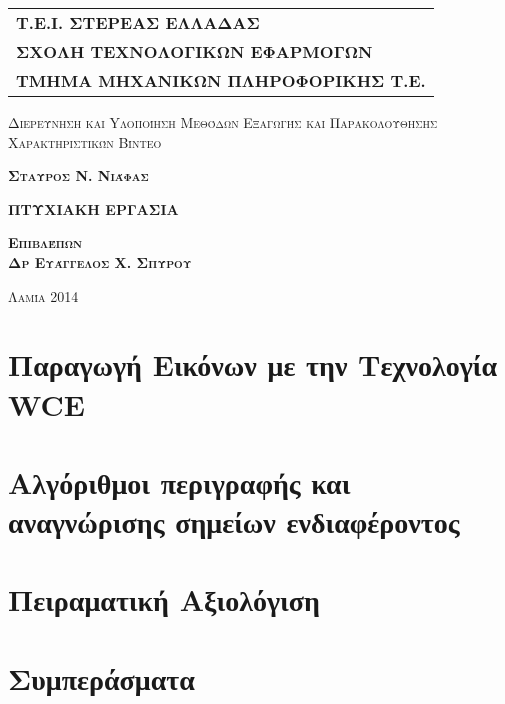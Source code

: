 \documentclass[a4paper,12pt]{report}
\begin{document}
\begin{tabular}[b]{l}

\textbf{T.E.I. ΣΤΕΡΕΑΣ ΕΛΛΑΔΑΣ} \\
\textbf{ΣΧΟΛΗ ΤΕΧΝΟΛΟΓΙΚΩΝ ΕΦΑΡΜΟΓΩΝ}\\
\textbf{ΤΜΗΜΑ ΜΗΧΑΝΙΚΩΝ ΠΛΗΡΟΦΟΡΙΚΗΣ Τ.Ε.}


\end{tabular}

\begin{center}
 
\vspace*{3cm}



\textsc{\LARGE Διερεύνηση και Yλοποίηση Mεθόδων Eξαγωγής και Παρακολούθησης Χαρακτηριστικών Βίντεο } 
  
\vspace*{1.5cm}

\textsc{\Large\textbf{Σταύρος Ν. Νιάφας}} 
  
  
\vspace*{2cm}

  \textsc{\large\textbf{ΠΤΥΧΙΑΚΗ ΕΡΓΑΣΙΑ}}
  
\vspace*{5cm}

  \textsc{\large\textbf{Eπιβλέπων}} \\
  \textsc{\large\textbf{Δρ Ευάγγελος Χ. Σπύρου}} 
  
  \vspace*{5cm}
  
  \textsc{\normalsize{Λαμία 2014}} 
  
\end{center}




\thispagestyle{empty}



\tableofcontents
\listoffigures
\listoftables


\chapter{Παραγωγή Εικόνων με την Τεχνολογία WCE}

\chapter{Αλγόριθμοι περιγραφής και αναγνώρισης σημείων ενδιαφέροντος}
%
\chapter{Πειραματική Αξιολόγιση}
%
%
\chapter{Συμπεράσματα}
%




\end{document}

